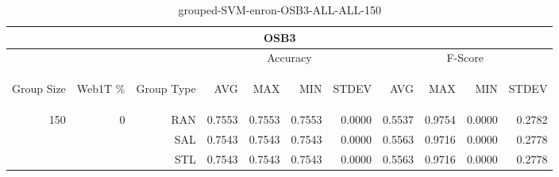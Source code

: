 \begin{center}
\begin{table}[htbp] 
 \begin{center}
\begin{tabular}{ | r | r | r | r | r | r | r | r | r | r | r |}
\hline
\multicolumn{11}{|c|}{OSB3}\\
\hline
 & & & \multicolumn{4}{|c|}{Accuracy} & \multicolumn{4}{|c|}{F-Score}\\ \cline{4-11}
\begin{sideways}Group Size\end{sideways} & \begin{sideways}Web1T \%\end{sideways} & \begin{sideways}Group Type\end{sideways} & \begin{sideways}AVG\end{sideways} & \begin{sideways}MAX\end{sideways} & \begin{sideways}MIN\end{sideways} & \begin{sideways}STDEV\end{sideways} & \begin{sideways}AVG\end{sideways} & \begin{sideways}MAX\end{sideways} & \begin{sideways}MIN\end{sideways} & \begin{sideways}STDEV\end{sideways}\\
\hline
\multirow{3}{*}{150}
 & \multirow{3}{*}{0} & RAN & 0.7553 & 0.7553 & 0.7553 & 0.0000 & 0.5537 & 0.9754 & 0.0000 & 0.2782\\ \cline{3-11}
 &   & SAL & 0.7543 & 0.7543 & 0.7543 & 0.0000 & 0.5563 & 0.9716 & 0.0000 & 0.2778\\ \cline{3-11}
 &   & STL & 0.7543 & 0.7543 & 0.7543 & 0.0000 & 0.5563 & 0.9716 & 0.0000 & 0.2778\\ \cline{2-11}
\hline
\end{tabular}
\caption{grouped-SVM-enron-OSB3-ALL-ALL-150}
\end{center}
 \end{table}
\end{center}

